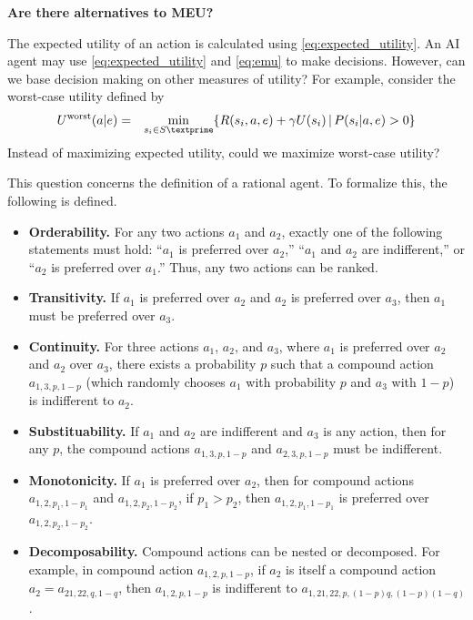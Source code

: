 \begin{mdframed}
	\noindent \textbf{Are there alternatives to MEU?}
	
	The expected utility of an action is calculated using \eqref{eq:expected_utility}. An AI agent may use \eqref{eq:expected_utility} and \eqref{eq:emu} to make decisions. However, can we base decision making on other measures of utility? For example, consider the worst-case utility defined by
	\begin{eqnarray}
		U^{\mathrm{worst}}(a|e) &=& \min_{s_i\in S\textprime}\{R(s_i,a,e) + \gamma U(s_i)\,|\,P(s_i|a,e) > 0\} \nonumber
	\end{eqnarray}
	Instead of maximizing expected utility, could we maximize worst-case utility?
	
	This question concerns the definition of a rational agent. To formalize this, the following  is defined.
	\begin{itemize}
		\item \textbf{Orderability.} For any two actions $a_1$ and $a_2$, exactly one of the following statements must hold: “$a_1$ is preferred over $a_2$,” “$a_1$ and $a_2$ are indifferent,” or “$a_2$ is preferred over $a_1$.” Thus, any two actions can be ranked.
		\item \textbf{Transitivity.} If $a_1$ is preferred over $a_2$ and $a_2$ is preferred over $a_3$, then $a_1$ must be preferred over $a_3$.
		\item \textbf{Continuity.} For three actions $a_1$, $a_2$, and $a_3$, where $a_1$ is preferred over $a_2$ and $a_2$ over $a_3$, there exists a probability $p$ such that a compound action $a_{1,3,p,1-p}$ (which randomly chooses $a_1$ with probability $p$ and $a_3$ with $1-p$) is indifferent to $a_2$.
		\item \textbf{Substituability.} If $a_1$ and $a_2$ are indifferent and $a_3$ is any action, then for any $p$, the compound actions $a_{1,3,p,1-p}$ and $a_{2,3,p,1-p}$ must be indifferent.
		\item \textbf{Monotonicity.} If $a_1$ is preferred over $a_2$, then for compound actions $a_{1,2,p_1,1-p_1}$ and $a_{1,2,p_2,1-p_2}$, if $p_1 > p_2$, then $a_{1,2,p_1,1-p_1}$ is preferred over $a_{1,2,p_2,1-p_2}$.
		\item \textbf{Decomposability.} Compound actions can be nested or decomposed. For example, in compound action $a_{1,2,p,1-p}$, if $a_2$ is itself a compound action $a_2 = a_{21,22,q,1-q}$, then $a_{1,2,p,1-p}$ is indifferent to $a_{1,21,22,p,(1-p)q,(1-p)(1-q)}$.
	\end{itemize}
	

\end{mdframed}
